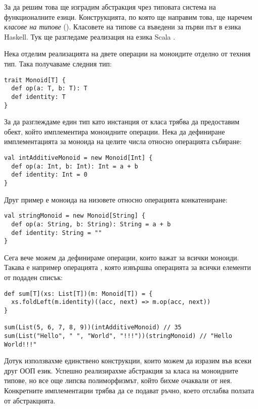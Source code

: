 За да решим това ще изградим абстракция чрез типовата система на функционалните езици. Конструкцията, по която ще направим това, ще наречем \emph{класове на типове} (). Класовете на типове са въведени за първи път в езика Haskell. Тук ще разгледаме реализация на езика Scala \cite{oliveira2010TypeClasses}.

Нека отделим реализацията на двете операции на моноидите отделно от техния тип. Така получаваме следния тип:

\begin{lstlisting}
trait Monoid[T] {
  def op(a: T, b: T): T
  def identity: T
}
\end{lstlisting}

За да разглеждаме един тип като инстанция от класа  трябва да предоставим обект, който имплементира моноидните операции. Нека да дефиниране имплементацията за моноида на целите числа относно операцията събиране:

\begin{lstlisting}
val intAdditiveMonoid = new Monoid[Int] {
  def op(a: Int, b: Int): Int = a + b
  def identity: Int = 0
}
\end{lstlisting}

Друг пример е моноида на низовете относно операцията конкатениране:

\begin{lstlisting}
val stringMonoid = new Monoid[String] {
  def op(a: String, b: String): String = a + b
  def identity: String = ""
}
\end{lstlisting}

Сега вече можем да дефинираме операции, които важат за всички моноиди. Такава е например операцията , която извършва операцията за всички елементи от подаден списък:

\begin{lstlisting}
def sum[T](xs: List[T])(m: Monoid[T]) = {
  xs.foldLeft(m.identity)((acc, next) => m.op(acc, next))
}

sum(List(5, 6, 7, 8, 9))(intAdditiveMonoid) // 35
sum(List("Hello", " ", "World", "!!!"))(stringMonoid) // "Hello World!!!"
\end{lstlisting}

Дотук използвахме единствено конструкции, които можем да изразим във всеки друг ООП език. Успешно реализирахме абстракция за класа на моноидните типове, но все още липсва полиморфизмът, който бихме очаквали от нея. Конкретните имплементации трябва да се подават ръчно, което отслабва ползата от абстракцията.

